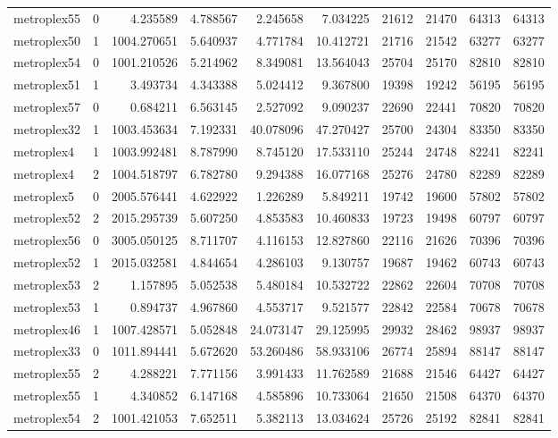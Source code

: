 \begin{longtable}{|l|r|r|r|r|r|r|r|r|r|}
metroplex55 & 0 & 4.235589 & 4.788567 & 2.245658 & 7.034225 & 21612 & 21470 & 64313 & 64313 \\
metroplex50 & 1 & 1004.270651 & 5.640937 & 4.771784 & 10.412721 & 21716 & 21542 & 63277 & 63277 \\
metroplex54 & 0 & 1001.210526 & 5.214962 & 8.349081 & 13.564043 & 25704 & 25170 & 82810 & 82810 \\
metroplex51 & 1 & 3.493734 & 4.343388 & 5.024412 & 9.367800 & 19398 & 19242 & 56195 & 56195 \\
metroplex57 & 0 & 0.684211 & 6.563145 & 2.527092 & 9.090237 & 22690 & 22441 & 70820 & 70820 \\
metroplex32 & 1 & 1003.453634 & 7.192331 & 40.078096 & 47.270427 & 25700 & 24304 & 83350 & 83350 \\
metroplex4 & 1 & 1003.992481 & 8.787990 & 8.745120 & 17.533110 & 25244 & 24748 & 82241 & 82241 \\
metroplex4 & 2 & 1004.518797 & 6.782780 & 9.294388 & 16.077168 & 25276 & 24780 & 82289 & 82289 \\
metroplex5 & 0 & 2005.576441 & 4.622922 & 1.226289 & 5.849211 & 19742 & 19600 & 57802 & 57802 \\
metroplex52 & 2 & 2015.295739 & 5.607250 & 4.853583 & 10.460833 & 19723 & 19498 & 60797 & 60797 \\
metroplex56 & 0 & 3005.050125 & 8.711707 & 4.116153 & 12.827860 & 22116 & 21626 & 70396 & 70396 \\
metroplex52 & 1 & 2015.032581 & 4.844654 & 4.286103 & 9.130757 & 19687 & 19462 & 60743 & 60743 \\
metroplex53 & 2 & 1.157895 & 5.052538 & 5.480184 & 10.532722 & 22862 & 22604 & 70708 & 70708 \\
metroplex53 & 1 & 0.894737 & 4.967860 & 4.553717 & 9.521577 & 22842 & 22584 & 70678 & 70678 \\
metroplex46 & 1 & 1007.428571 & 5.052848 & 24.073147 & 29.125995 & 29932 & 28462 & 98937 & 98937 \\
metroplex33 & 0 & 1011.894441 & 5.672620 & 53.260486 & 58.933106 & 26774 & 25894 & 88147 & 88147 \\
metroplex55 & 2 & 4.288221 & 7.771156 & 3.991433 & 11.762589 & 21688 & 21546 & 64427 & 64427 \\
metroplex55 & 1 & 4.340852 & 6.147168 & 4.585896 & 10.733064 & 21650 & 21508 & 64370 & 64370 \\
metroplex54 & 2 & 1001.421053 & 7.652511 & 5.382113 & 13.034624 & 25726 & 25192 & 82841 & 82841 \\

\end{longtable}

